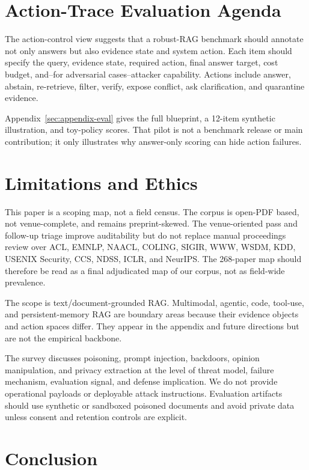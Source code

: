 \documentclass[11pt]{article}
\begin{document}
\section{Action-Trace Evaluation Agenda}
\label{sec:evaluation}

The action-control view suggests that a robust-RAG benchmark should annotate not only answers but also evidence state and system action. Each item should specify the query, evidence state, required action, final answer target, cost budget, and--for adversarial cases--attacker capability. Actions include answer, abstain, re-retrieve, filter, verify, expose conflict, ask clarification, and quarantine evidence.

Appendix~\ref{sec:appendix-eval} gives the full blueprint, a 12-item synthetic illustration, and toy-policy scores. That pilot is not a benchmark release or main contribution; it only illustrates why answer-only scoring can hide action failures.

\section{Limitations and Ethics}

This paper is a scoping map, not a field census. The corpus is open-PDF based, not venue-complete, and remains preprint-skewed. The venue-oriented pass and follow-up triage improve auditability but do not replace manual proceedings review over ACL, EMNLP, NAACL, COLING, SIGIR, WWW, WSDM, KDD, USENIX Security, CCS, NDSS, ICLR, and NeurIPS. The 268-paper map should therefore be read as a final adjudicated map of our corpus, not as field-wide prevalence.

The scope is text/document-grounded RAG. Multimodal, agentic, code, tool-use, and persistent-memory RAG are boundary areas because their evidence objects and action spaces differ. They appear in the appendix and future directions but are not the empirical backbone.

The survey discusses poisoning, prompt injection, backdoors, opinion manipulation, and privacy extraction at the level of threat model, failure mechanism, evaluation signal, and defense implication. We do not provide operational payloads or deployable attack instructions. Evaluation artifacts should use synthetic or sandboxed poisoned documents and avoid private data unless consent and retention controls are explicit.

\section{Conclusion}
\end{document}
